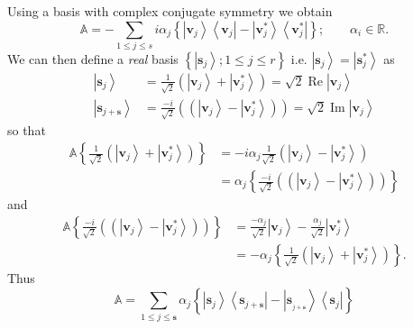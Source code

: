 \documentclass[preprint,aps,showkeys]{revtex4}%
\begin{document}
Using a basis with complex conjugate symmetry we obtain
\begin{equation}
\mathbb{A}=-\sum_{1\leq j\leq s}i\alpha_{j}\left\{  \left\vert \mathbf{v}%
_{j}\right\rangle \left\langle \mathbf{v}_{j}\right\vert -\left\vert
\mathbf{v}_{j}^{\ast}\right\rangle \left\langle \mathbf{v}_{j}^{\ast
}\right\vert \right\}  ;\qquad\alpha_{i}\in\mathbb{R}.
\end{equation}
We can then define a \emph{real} basis $\left\{  \left\vert \mathbf{s}%
_{j}\right\rangle ;1\leq j\leq r\right\}  $ i.e. $\left\vert \mathbf{s}%
_{j}\right\rangle =\left\vert \mathbf{s}_{j}^{\ast}\right\rangle $ as
\begin{align}
\left\vert \mathbf{s}_{j}\right\rangle  &  =\frac{1}{\sqrt{2}}\left(
\left\vert \mathbf{v}_{j}\right\rangle +\left\vert \mathbf{v}_{j}^{\ast
}\right\rangle \right)  =\sqrt{2}\operatorname{Re}\left\vert \mathbf{v}%
_{j}\right\rangle \nonumber\\
\left\vert \mathbf{s}_{j+\mathbf{s}}\right\rangle  &  =\frac{-i}{\sqrt{2}%
}\left(  \left(  \left\vert \mathbf{v}_{j}\right\rangle -\left\vert
\mathbf{v}_{j}^{\ast}\right\rangle \right)  \right)  =\sqrt{2}%
\operatorname{Im}\left\vert \mathbf{v}_{j}\right\rangle
\end{align}
so that
\begin{align}
\mathbb{A}\left\{  \frac{1}{\sqrt{2}}\left(  \left\vert \mathbf{v}%
_{j}\right\rangle +\left\vert \mathbf{v}_{j}^{\ast}\right\rangle \right)
\right\}   &  =-i\alpha_{j}\frac{1}{\sqrt{2}}\left(  \left\vert \mathbf{v}%
_{j}\right\rangle -\left\vert \mathbf{v}_{j}^{\ast}\right\rangle \right)
\nonumber\\
&  =\alpha_{j}\left\{  \frac{-i}{\sqrt{2}}\left(  \left(  \left\vert
\mathbf{v}_{j}\right\rangle -\left\vert \mathbf{v}_{j}^{\ast}\right\rangle
\right)  \right)  \right\}
\end{align}
and
\begin{align}
\mathbb{A}\left\{  \frac{-i}{\sqrt{2}}\left(  \left(  \left\vert
\mathbf{v}_{j}\right\rangle -\left\vert \mathbf{v}_{j}^{\ast}\right\rangle
\right)  \right)  \right\}   &  =\frac{-\alpha_{j}}{\sqrt{2}}\left\vert
\mathbf{v}_{j}\right\rangle -\frac{\alpha_{j}}{\sqrt{2}}\left\vert
\mathbf{v}_{j}^{\ast}\right\rangle \nonumber\\
&  =-\alpha_{j}\left\{  \frac{1}{\sqrt{2}}\left(  \left\vert \mathbf{v}%
_{j}\right\rangle +\left\vert \mathbf{v}_{j}^{\ast}\right\rangle \right)
\right\}  .
\end{align}
Thus
\begin{equation}
\mathbb{A=}\sum_{1\leq j\leq\mathbf{s}}\alpha_{j}\left\{  \left\vert
\mathbf{s}_{j}\right\rangle \left\langle \mathbf{s}_{j+\mathbf{s}}\right\vert
-\left\vert \mathbf{s}_{_{j+\mathbf{s}}}\right\rangle \left\langle
\mathbf{s}_{j}\right\vert \right\}
\end{equation}
\end{document}

